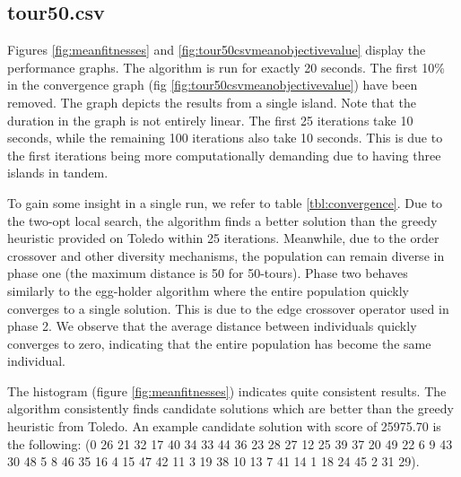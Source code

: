 \documentclass[a4paper,10pt]{article}
\newcommand{\ReplaceMe}[1]{{\color{blue}#1}}
\begin{document}
	

\subsection{tour50.csv}	
	Figures \ref{fig:meanfitnesses} and \ref{fig:tour50csvmeanobjectivevalue} display the performance graphs. The algorithm is run for exactly 20 seconds. The first 10\% in the convergence graph (fig \ref{fig:tour50csvmeanobjectivevalue}) have been removed. The graph depicts the results from a single island. Note that the duration in the graph is not entirely linear. The first 25 iterations take 10 seconds, while the remaining 100 iterations also take 10 seconds. This is due to the first iterations being more computationally demanding due to having three islands in tandem.
	
	To gain some insight in a single run, we refer to table \ref{tbl:convergence}. Due to the two-opt local search, the algorithm finds a better solution than the greedy heuristic provided on Toledo within 25 iterations. Meanwhile, due to the order crossover and other diversity mechanisms, the population can remain diverse in phase one (the maximum distance is 50 for 50-tours). Phase two behaves similarly to the egg-holder algorithm where the entire population quickly converges to a single solution. This is due to the edge crossover operator used in phase 2. We observe that the average distance between individuals quickly converges to zero, indicating that the entire population has become the same individual.
	
	The histogram (figure \ref{fig:meanfitnesses}) indicates quite consistent results. The algorithm consistently finds candidate solutions which are better than the greedy heuristic from Toledo.
	An example candidate solution with score of 25975.70 is the following: (0 26 21	32	17	40	34	33	44	36	23	28	27	12	25	39	37	20	49	22	6	9	43	30	48	5	8	46	35	16	4	15	47	42	11	3	19	38	10	13	7	41	14	1	18	24	45	2	31	29).


	
\end{document}
